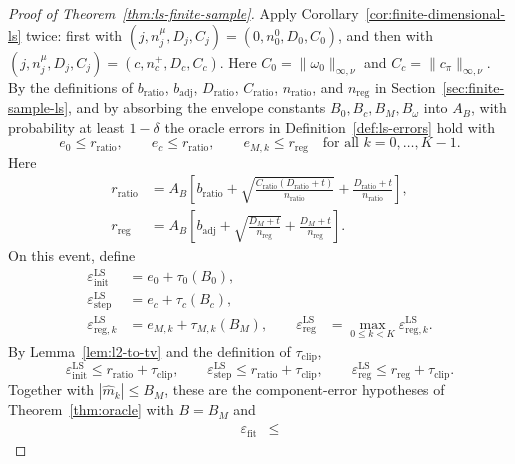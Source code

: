 \documentclass{article}
\newcommand{\mhat}{\widehat m}
\newcommand{\1}{\mathbf{1}}
\newcommand{\cpi}{c_\pi}
\newcommand{\omegazero}{\omega_0}
\newcommand{\abs}[1]{\left\lvert #1 \right\rvert}
\theoremstyle{plain}
\theoremstyle{definition}
\theoremstyle{remark}
\begin{document}
\begin{proof}[Proof of Theorem~\ref{thm:ls-finite-sample}]
Apply Corollary~\ref{cor:finite-dimensional-ls} twice: first with
$(j,n_j^\mu,D_j,C_j)=(0,n_0^0,D_0,C_0)$, and then with
$(j,n_j^\mu,D_j,C_j)=(c,n_c^+,D_c,C_c)$. Here $C_0=\|\omegazero\|_{\infty,\nu}$ and
$C_c=\|\cpi\|_{\infty,\nu}$.
By the definitions of $b_{\mathrm{ratio}}$, $b_{\mathrm{adj}}$, $D_{\mathrm{ratio}}$,
$C_{\mathrm{ratio}}$, $n_{\mathrm{ratio}}$, and $n_{\mathrm{reg}}$ in
Section~\ref{sec:finite-sample-ls}, and by absorbing the envelope constants
$B_0,B_c,B_M,B_\omega$ into $A_B$, with probability at least $1-\delta$
the oracle errors in Definition~\ref{def:ls-errors} hold with
\[
    e_0\le r_{\mathrm{ratio}},
    \qquad
    e_c\le r_{\mathrm{ratio}},
    \qquad
    e_{M,k}\le r_{\mathrm{reg}}
    \quad\text{for all }k=0,\ldots,K-1 .
\]
Here
\[
\begin{aligned}
    r_{\mathrm{ratio}}
    &=
    A_B\left[
        b_{\mathrm{ratio}}
        +\sqrt{\frac{C_{\mathrm{ratio}}(D_{\mathrm{ratio}}+t)}{n_{\mathrm{ratio}}}}
        +\frac{D_{\mathrm{ratio}}+t}{n_{\mathrm{ratio}}}
    \right],\\
    r_{\mathrm{reg}}
    &=
    A_B\left[
        b_{\mathrm{adj}}
        +\sqrt{\frac{D_M+t}{n_{\mathrm{reg}}}}
        +\frac{D_M+t}{n_{\mathrm{reg}}}
    \right].
\end{aligned}
\]
On this event, define
\[
\begin{aligned}
    \varepsilon_{\mathrm{init}}^{\mathrm{LS}}
    &=
    e_0+\tau_0(B_0),\\
    \varepsilon_{\mathrm{step}}^{\mathrm{LS}}
    &=
    e_c+\tau_c(B_c),\\
    \varepsilon_{\mathrm{reg},k}^{\mathrm{LS}}
    &=
    e_{M,k}+\tau_{M,k}(B_M),
    \qquad
    \varepsilon_{\mathrm{reg}}^{\mathrm{LS}}
    &=
    \max_{0\le k<K}\varepsilon_{\mathrm{reg},k}^{\mathrm{LS}}.
\end{aligned}
\]
By Lemma~\ref{lem:l2-to-tv} and the definition of $\tau_{\mathrm{clip}}$,
\[
    \varepsilon_{\mathrm{init}}^{\mathrm{LS}}
    \le r_{\mathrm{ratio}}+\tau_{\mathrm{clip}},
    \qquad
    \varepsilon_{\mathrm{step}}^{\mathrm{LS}}
    \le r_{\mathrm{ratio}}+\tau_{\mathrm{clip}},
    \qquad
    \varepsilon_{\mathrm{reg}}^{\mathrm{LS}}
    \le r_{\mathrm{reg}}+\tau_{\mathrm{clip}}.
\]
Together with $\abs{\mhat_k}\le B_M$, these are the component-error hypotheses
of Theorem~\ref{thm:oracle} with $B=B_M$ and
\[
\begin{aligned}
    \varepsilon_{\mathrm{fit}}
    &\le

\end{aligned}\]
\end{proof}
\end{document}
